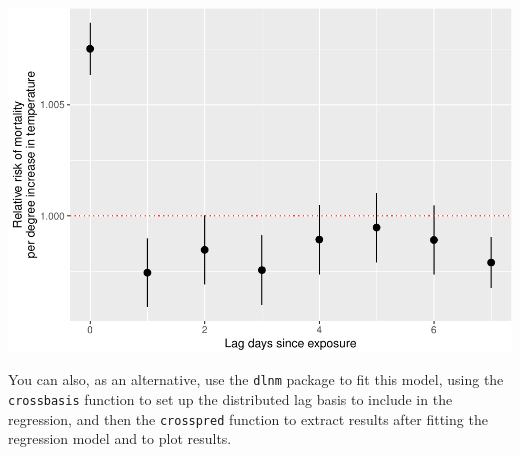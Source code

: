 \documentclass[
]{book}
\newenvironment{Shaded}{\begin{snugshade}}{\end{snugshade}}
\newcommand{\CharTok}[1]{\textcolor[rgb]{0.31,0.60,0.02}{#1}}
\newcommand{\DataTypeTok}[1]{\textcolor[rgb]{0.13,0.29,0.53}{#1}}
\newcommand{\DecValTok}[1]{\textcolor[rgb]{0.00,0.00,0.81}{#1}}
\newcommand{\KeywordTok}[1]{\textcolor[rgb]{0.13,0.29,0.53}{\textbf{#1}}}
\newcommand{\NormalTok}[1]{#1}
\newcommand{\OperatorTok}[1]{\textcolor[rgb]{0.81,0.36,0.00}{\textbf{#1}}}
\newcommand{\StringTok}[1]{\textcolor[rgb]{0.31,0.60,0.02}{#1}}
\begin{document}
\begin{Shaded}
\end{Shaded}

\includegraphics{adv_epi_analysis_files/figure-latex/unnamed-chunk-90-1.pdf}

You can also, as an alternative, use the \texttt{dlnm} package to fit this
model, using the \texttt{crossbasis} function
to set up the distributed lag basis to include in the regression, and then the \texttt{crosspred}
function to extract results after fitting the regression model and to plot results.
\end{document}
